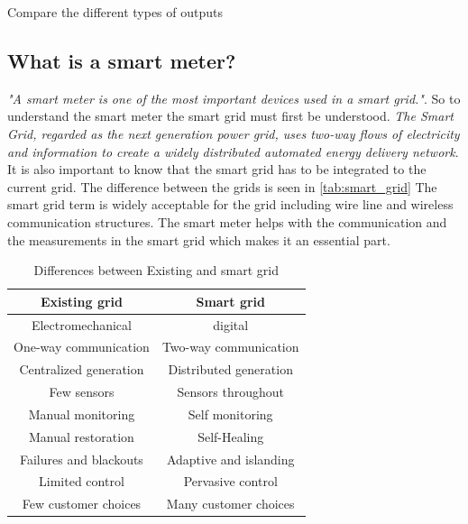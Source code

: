 Compare the different types of outputs

\subsection{What is a smart meter?}
\textit{"A smart meter is one of the most important devices used in a smart grid."}\cite{SmartMeterInfo}. So to understand the smart meter the smart grid must first be understood. \textit{The Smart Grid, regarded as the next generation power grid, uses two-way flows of electricity and information to create a widely distributed automated energy delivery network}\cite{smartGrid}. It is also important to know that the smart grid has to be integrated to the current grid\cite{SmartHomeSmartGrid}. The difference between the grids is seen in \autoref{tab:smart_grid} The smart grid term is widely acceptable for the grid including wire line and wireless communication structures. The smart meter helps with the communication and the measurements in the smart grid which makes it an essential part.

\begin{table}[H]
    \centering
    \begin{tabular}{|c|c|}\hline
        \textbf{Existing grid} & \textbf{Smart grid}\\\hline
        Electromechanical& digital \\\hline
        One-way communication & Two-way communication \\\hline
        Centralized generation & Distributed generation \\\hline
        Few sensors & Sensors throughout\\\hline
        Manual monitoring & Self monitoring \\\hline
        Manual restoration& Self-Healing \\\hline
        Failures and blackouts & Adaptive and islanding \\\hline
        Limited control & Pervasive control\\\hline
        Few customer choices & Many customer choices \\\hline
    \end{tabular}
    \caption{Differences between Existing and smart grid\cite{SmartMeterInfo}}
    \label{tab:smart_grid}
\end{table}

